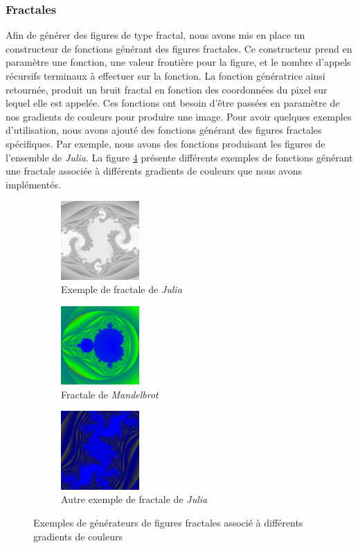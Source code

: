 \documentclass[11pt]{article}
\begin{document}
\subsubsection{Fractales}

Afin de générer des figures de type fractal, nous avons mis en place un constructeur de fonctions générant des figures fractales. Ce constructeur prend en paramètre une fonction, une valeur frontière pour la figure, et le nombre d'appels récursifs terminaux à effectuer sur la fonction. 
La fonction génératrice ainsi retournée, produit un bruit fractal en fonction des coordonnées du pixel sur lequel elle est appelée. Ces fonctions ont besoin d'être passées en paramètre de nos gradients de couleurs pour produire une image. Pour avoir quelques exemples d'utilisation, nous avons ajouté des fonctions générant des figures fractales spécifiques. Par exemple, nous avons des fonctions produisant les figures de l'ensemble de \textit{Julia}. La figure \ref{fig:colormappred} présente différents exemples de fonctions générant une fractale associée à différents gradients de couleurs que nous avons implémentés.

\begin{figure}[H]
    \centering
    \begin{subfigure}{0.2\textwidth}
    \centering
        \includegraphics[width=3cm]{Images/juliaDragon.png}
        \caption{Exemple de fractale de \textit{Julia}}
        \label{fig:juliaDragon}
    \end{subfigure}
    \begin{subfigure}{0.2\textwidth}
    \centering
        \includegraphics[width=3cm]{Images/mandelBrot.png}
        \caption{Fractale de \textit{Mandelbrot}}
        \label{fig:mandelbrot}
    \end{subfigure}
    \begin{subfigure}{0.2\textwidth}
    \centering
        \includegraphics[width=3cm]{Images/juliaBubble.png}
        \caption{Autre exemple de fractale de \textit{Julia}}
        \label{fig:juliaBubble}
    \end{subfigure}
    \caption{Exemples de générateurs de figures fractales associé à différents gradients de couleurs}
    \label{fig:colormappred}
\end{figure}
\end{document}
